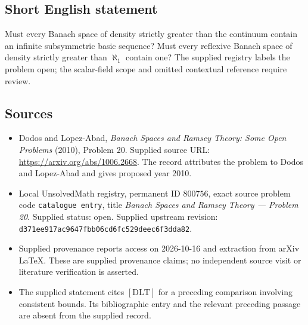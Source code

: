 \documentclass[11pt]{article}
\begin{document}
\subsection{Short English statement}
Must every Banach space of density strictly greater than the continuum contain an infinite subsymmetric basic sequence? Must every reflexive Banach space of density strictly greater than \(\aleph_1\) contain one? The supplied registry labels the problem open; the scalar-field scope and omitted contextual reference require review.
\subsection{Sources}
\begin{itemize}
\item Dodos and Lopez-Abad, \emph{Banach Spaces and Ramsey Theory: Some Open Problems} (2010), Problem 20. Supplied source URL: \url{https://arxiv.org/abs/1006.2668}. The record attributes the problem to Dodos and Lopez-Abad and gives proposed year 2010.
\item Local UnsolvedMath registry, permanent ID \(800756\), exact source problem code \texttt{catalogue entry}, title \emph{Banach Spaces and Ramsey Theory --- Problem 20}. Supplied status: open. Supplied upstream revision: \texttt{d371ee917ac9647fbb06cd6fc529deec6f3dda82}.
\item Supplied provenance reports access on 2026-10-16 and extraction from arXiv LaTeX. These are supplied provenance claims; no independent source visit or literature verification is asserted.
\item The supplied statement cites \([\mathrm{DLT}]\) for a preceding comparison involving consistent bounds. Its bibliographic entry and the relevant preceding passage are absent from the supplied record.
\end{itemize}
\end{document}
